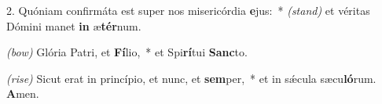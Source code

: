2. Quóniam confirmáta est super nos misericórdia \textbf{e}jus:~* {\color{red}\textit{(stand)}} et véritas Dómini manet \textbf{in} æ\textbf{tér}num.

{\color{red}\textit{(bow)}} Glória Patri, et \textbf{Fí}lio,~* et Spi\textbf{rí}tui \textbf{Sanc}to.

{\color{red}\textit{(rise)}} Sicut erat in princípio, et nunc, et \textbf{sem}per,~* et in sǽcula sæcu\textbf{ló}rum. \textbf{A}men.